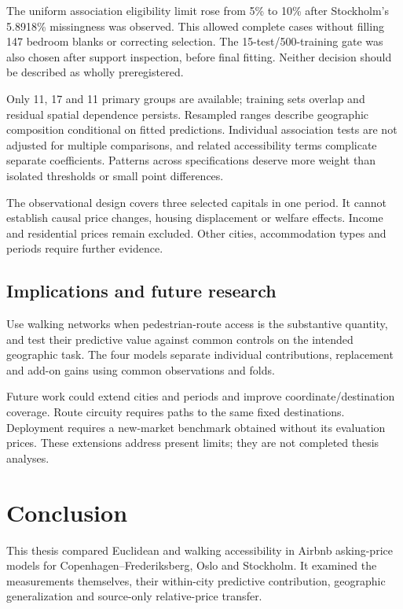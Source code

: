 \documentclass[11pt,a4paper,oneside,openany]{memoir}
\begin{document}
The uniform association eligibility limit rose from 5\% to 10\% after Stockholm's
5.8918\% missingness was observed. This allowed complete cases without filling
147 bedroom blanks or correcting selection. The 15-test/500-training gate was
also chosen after support inspection, before final fitting. Neither decision
should be described as wholly preregistered.

Only 11, 17 and 11 primary groups are available; training sets overlap and
residual spatial dependence persists. Resampled ranges describe geographic
composition conditional on fitted predictions. Individual association tests
are not adjusted for multiple comparisons, and related accessibility terms
complicate separate coefficients. Patterns across specifications deserve more
weight than isolated thresholds or small point differences.

The observational design covers three selected capitals in one period. It
cannot establish causal price changes, housing displacement or welfare effects.
Income and residential prices remain excluded. Other cities, accommodation
types and periods require further evidence.

\section{Implications and future research}
\label{sec:implications}
Use walking networks when pedestrian-route access is the substantive quantity,
and test their predictive value against common controls on the intended
geographic task. The four models separate individual contributions, replacement
and add-on gains using common observations and folds.

Future work could extend cities and periods and improve coordinate/destination
coverage. Route circuity requires paths to the same fixed destinations. Deployment
requires a new-market benchmark obtained without its evaluation prices. These
extensions address present limits; they are not completed thesis analyses.

\chapter{Conclusion}
\label{ch:conclusion}
This thesis compared Euclidean and walking accessibility in Airbnb asking-price
models for Copenhagen--Frederiksberg, Oslo and Stockholm. It examined the
measurements themselves, their within-city predictive contribution, geographic
generalization and source-only relative-price transfer.
\end{document}
